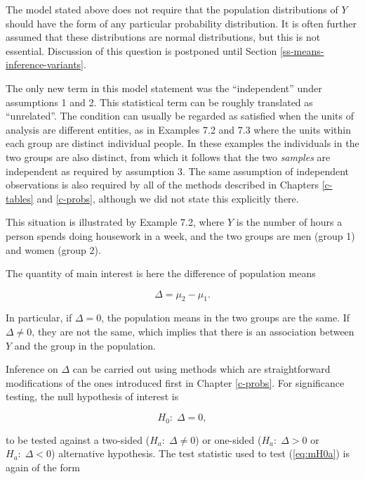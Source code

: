 \documentclass[11pt,a4paper,openany]{book}
\begin{document}
The model stated above does not require that the population
distributions of \(Y\) should have the form of any particular
probability distribution. It is often further assumed that these
distributions are normal distributions, but this is not essential.
Discussion of this question is postponed until Section
\ref{ss-means-inference-variants}.

The only new term in this model statement was the ``independent'' under
assumptions 1 and 2. This statistical term can be roughly translated as
``unrelated''. The condition can usually be regarded as satisfied when
the units of analysis are different entities, as in Examples 7.2 and 7.3
where the units within each group are distinct individual people. In
these examples the individuals in the two groups are also distinct, from
which it follows that the two \emph{samples} are independent as required
by assumption 3. The same assumption of independent observations is also
required by all of the methods described in Chapters \ref{c-tables} and
\ref{c-probs}, although we did not state this explicitly there.

This situation is illustrated by Example 7.2, where \(Y\) is the number
of hours a person spends doing housework in a week, and the two groups
are men (group 1) and women (group 2).

The quantity of main interest is here the difference of population means

\begin{equation} \Delta=\mu_{2}-\mu_{1}.
\label{eq:DeltaB} \end{equation}

In particular, if \(\Delta=0\), the population means in the two groups
are the same. If \(\Delta\ne 0\), they are not the same, which implies
that there is an association between \(Y\) and the group in the
population.

Inference on \(\Delta\) can be carried out using methods which are
straightforward modifications of the ones introduced first in Chapter
\ref{c-probs}. For significance testing, the null hypothesis of interest
is

\begin{equation}H_{0}: \; \Delta=0,
\label{eq:mH0a}\end{equation}

to be tested against a two-sided (\(H_{a}:\; \Delta\ne 0\)) or one-sided
(\(H_{a}:\; \Delta> 0\) or \(H_{a}:\; \Delta< 0\)) alternative
hypothesis. The test statistic used to test (\ref{eq:mH0a}) is again of
the form
\end{document}

